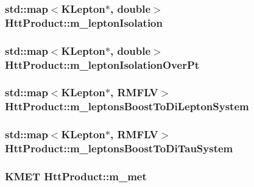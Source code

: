 \label{classHttProduct_ad25c9324459c0af1d52a48d390ba10f5}
\hypertarget{classHttProduct_adecfb7ee858684689f8d4aad6faa0be9}{
\subsubsection[{m\_\-leptonIsolation}]{\setlength{\rightskip}{0pt plus 5cm}std::map$<$KLepton$\ast$, double$>$ {\bf HttProduct::m\_\-leptonIsolation}}}
\label{classHttProduct_adecfb7ee858684689f8d4aad6faa0be9}
\hypertarget{classHttProduct_a6b289be98575ef2ae3f0d8c9ae7b432f}{
\subsubsection[{m\_\-leptonIsolationOverPt}]{\setlength{\rightskip}{0pt plus 5cm}std::map$<$KLepton$\ast$, double$>$ {\bf HttProduct::m\_\-leptonIsolationOverPt}}}
\label{classHttProduct_a6b289be98575ef2ae3f0d8c9ae7b432f}
\hypertarget{classHttProduct_a92352e3b04bf6249535bf5f02aef3193}{
\subsubsection[{m\_\-leptonsBoostToDiLeptonSystem}]{\setlength{\rightskip}{0pt plus 5cm}std::map$<$KLepton$\ast$, RMFLV$>$ {\bf HttProduct::m\_\-leptonsBoostToDiLeptonSystem}}}
\label{classHttProduct_a92352e3b04bf6249535bf5f02aef3193}
\hypertarget{classHttProduct_ac52a68f17b8c456a8dc7a23ca8c35926}{
\subsubsection[{m\_\-leptonsBoostToDiTauSystem}]{\setlength{\rightskip}{0pt plus 5cm}std::map$<$KLepton$\ast$, RMFLV$>$ {\bf HttProduct::m\_\-leptonsBoostToDiTauSystem}}}
\label{classHttProduct_ac52a68f17b8c456a8dc7a23ca8c35926}
\hypertarget{classHttProduct_a7c4828e5053357081c0b6013762913cd}{
\subsubsection[{m\_\-met}]{\setlength{\rightskip}{0pt plus 5cm}KMET {\bf HttProduct::m\_\-met}}}
